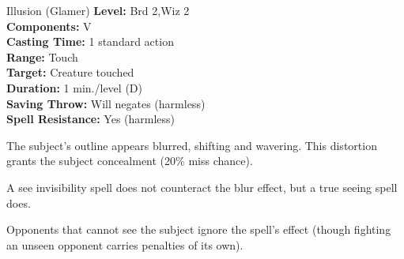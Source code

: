 {Illusion (Glamer)}
{
	\textbf{Level:}
	Brd 2,Wiz 2\\
	\textbf{Components:}
	V\\
	\textbf{Casting Time:}
	1 standard action\\
	\textbf{Range:}
	Touch\\
	\textbf{Target:}
	Creature touched\\
	\textbf{Duration:}
	1 min./level (D)\\
	\textbf{Saving Throw:}
	Will negates (harmless)\\
	\textbf{Spell Resistance:}
	Yes (harmless)\\
}
{
	The subject's outline appears blurred, shifting and wavering. This distortion grants the subject concealment (20\% miss chance).

	A see invisibility spell does not counteract the blur effect, but a true seeing spell does.

	Opponents that cannot see the subject ignore the spell's effect (though fighting an unseen opponent carries penalties of its own).

}
